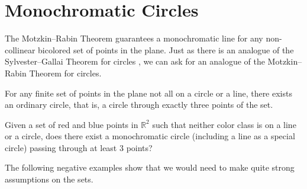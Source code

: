 \documentclass[a4paper,11pt,leqno]{article}
\begin{document}
\section{Monochromatic Circles} 
The Motzkin--Rabin Theorem guarantees a monochromatic line for any non-collinear bicolored set of points in the plane.
Just as there is an analogue of the Sylvester--Gallai Theorem for circles \cite{elliott1967}, we can ask for an analogue of the Motzkin--Rabin Theorem for circles.
\begin{theorem}[Elliott, 1967]
For any finite set of points in the plane not all on a circle or a line, there exists an ordinary circle, that is, a circle through exactly three points of the set.
\end{theorem}
\begin{question}
Given a set of red and blue points in $\mathbb{R}^2$ such that neither color class is on a line or a circle, does there exist a monochromatic circle (including a line as a special circle) passing through at least $3$ points?
\end{question}
The following negative examples show that we would need to make quite strong assumptions on the sets.
\end{document}
